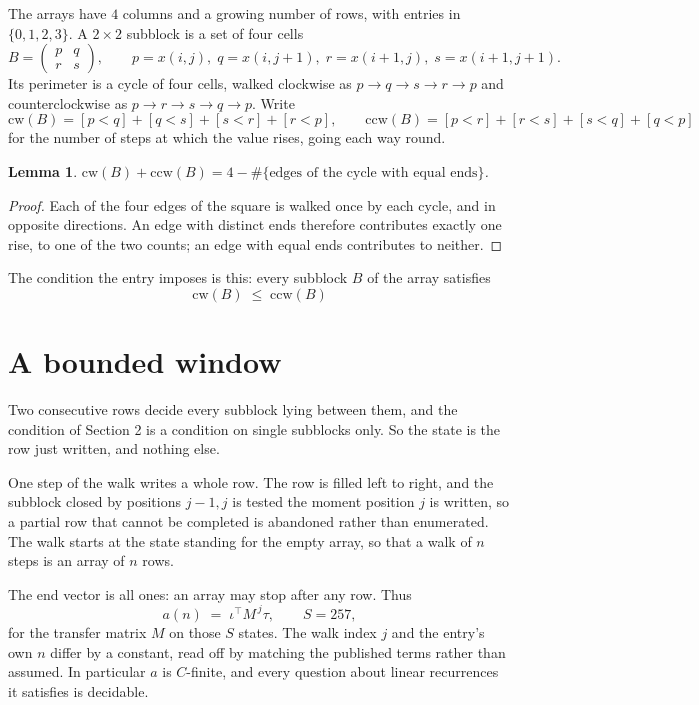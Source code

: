 \documentclass[11pt,a4paper]{article}
\theoremstyle{plain}
\newtheorem{lemma}[theorem]{Lemma}
\theoremstyle{definition}
\begin{document}
The arrays have $4$ columns and a growing number of rows, with entries in $\{0,1,2,3\}$. A
$2\times2$ subblock is a set of four cells
\[
B=\begin{pmatrix} p & q \\ r & s \end{pmatrix},
\qquad p=x(i,j),\; q=x(i,j+1),\; r=x(i+1,j),\; s=x(i+1,j+1).
\]
Its perimeter is a cycle of four cells, walked clockwise as $p\to q\to s\to r\to p$ and
counterclockwise as $p\to r\to s\to q\to p$. Write
\[
\mathrm{cw}(B)=[p<q]+[q<s]+[s<r]+[r<p],\qquad
\mathrm{ccw}(B)=[p<r]+[r<s]+[s<q]+[q<p]
\]
for the number of steps at which the value rises, going each way round.

\begin{lemma}\label{lem:sum}
$\mathrm{cw}(B)+\mathrm{ccw}(B)=4-\#\{\text{edges of the cycle with equal ends}\}$.
\end{lemma}

\begin{proof}
Each of the four edges of the square is walked once by each cycle, and in opposite directions.
An edge with distinct ends therefore contributes exactly one rise, to one of the two counts;
an edge with equal ends contributes to neither.
\end{proof}

The condition the entry imposes is this: every subblock $B$ of the array satisfies
\[
\mathrm{cw}(B)\;\le\;\mathrm{ccw}(B)
\]


\section{A bounded window}

Two consecutive rows decide every subblock lying between them, and the condition of Section 2 is a condition on single subblocks only. So the state is the row just written, and nothing else.

One step of the walk writes a whole row. The row is filled left to right, and the subblock
closed by positions $j-1,j$ is tested the moment position $j$ is written, so a partial row that
cannot be completed is abandoned rather than enumerated. The walk starts at the state standing
for the empty array, so that a walk of $n$ steps is an array of $n$ rows.

The end vector is all ones: an array may stop after any row. Thus
\[
a(n)\;=\;\iota^{\!\top}M^{\,j}\tau ,\qquad S=257,
\]
for the transfer matrix $M$ on those $S$ states. The walk index $j$ and the entry's own $n$
differ by a constant, read off by matching the published terms rather than assumed. In
particular $a$ is $C$-finite, and every question about linear recurrences it satisfies is
decidable.
\end{document}
